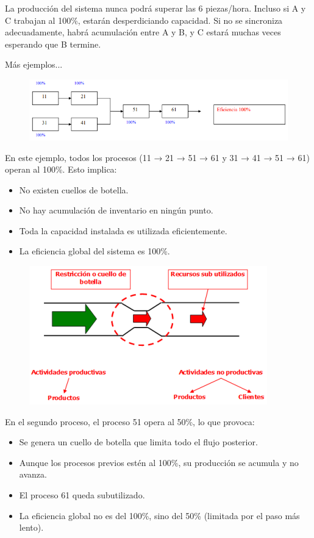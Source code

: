 \documentclass[a4paper,oneside,11pt]{article}
\begin{document}
La producción del sistema nunca podrá superar las 6 piezas/hora. Incluso si A y C trabajan al 100\%, estarán desperdiciando capacidad. Si no se sincroniza adecuadamente, habrá acumulación entre A y B, y C estará muchas veces esperando que B termine.

Más ejemplos...

\begin{figure} [ht!]
    \centering
    \includegraphics[scale=.9]{ejemplo1.png}
\end{figure}

En este ejemplo, todos los procesos (11 → 21 → 51 → 61 y 31 → 41 → 51 → 61) operan al 100\%. Esto implica:
\begin{itemize}
    \item No existen cuellos de botella.
    \item No hay acumulación de inventario en ningún punto.
    \item Toda la capacidad instalada es utilizada eficientemente.
    \item La eficiencia global del sistema es 100\%.
\end{itemize}

\begin{figure} [ht!]
    \centering
    \includegraphics[scale=0.9]{image.png}
\end{figure}

En el segundo proceso, el proceso 51 opera al 50\%, lo que provoca:
\begin{itemize}
    \item Se genera un cuello de botella que limita todo el flujo posterior.
    \item Aunque los procesos previos estén al 100\%, su producción se acumula y no avanza.
    \item El proceso 61 queda subutilizado.
    \item La eficiencia global no es del 100\%, sino del 50\% (limitada por el paso más lento).
    
\end{itemize}
\end{document}
